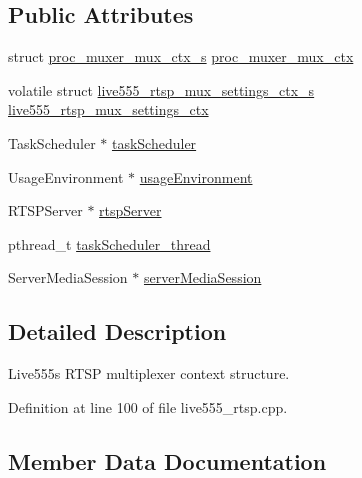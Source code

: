 \subsection*{Public Attributes}
\begin{DoxyCompactItemize}
\item 
struct \hyperlink{structproc__muxer__mux__ctx__s}{proc\+\_\+muxer\+\_\+mux\+\_\+ctx\+\_\+s} \hyperlink{structlive555__rtsp__mux__ctx__s_ab2d3e4e814802a6f61b65465bb222a7c}{proc\+\_\+muxer\+\_\+mux\+\_\+ctx}
\item 
volatile struct \hyperlink{structlive555__rtsp__mux__settings__ctx__s}{live555\+\_\+rtsp\+\_\+mux\+\_\+settings\+\_\+ctx\+\_\+s} \hyperlink{structlive555__rtsp__mux__ctx__s_a71c6838180308bfa9bf5e3c3caca682f}{live555\+\_\+rtsp\+\_\+mux\+\_\+settings\+\_\+ctx}
\item 
Task\+Scheduler $\ast$ \hyperlink{structlive555__rtsp__mux__ctx__s_a9cee4d2b64755aad6fd9d98fddcf0c30}{task\+Scheduler}
\item 
Usage\+Environment $\ast$ \hyperlink{structlive555__rtsp__mux__ctx__s_aeb1c6f315ab2d2d6a7c10f014a95251a}{usage\+Environment}
\item 
R\+T\+S\+P\+Server $\ast$ \hyperlink{structlive555__rtsp__mux__ctx__s_a3c89cf1bf900f3846aee1e8a4508043d}{rtsp\+Server}
\item 
pthread\+\_\+t \hyperlink{structlive555__rtsp__mux__ctx__s_af825f93bf9fcae44c41ace5af235c8de}{task\+Scheduler\+\_\+thread}
\item 
Server\+Media\+Session $\ast$ \hyperlink{structlive555__rtsp__mux__ctx__s_acd9455b0d78bac504d4de35d55729e02}{server\+Media\+Session}
\end{DoxyCompactItemize}


\subsection{Detailed Description}
Live555\textquotesingle{}s R\+T\+SP multiplexer context structure. 

Definition at line 100 of file live555\+\_\+rtsp.\+cpp.



\subsection{Member Data Documentation}
